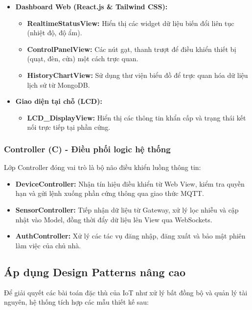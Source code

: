 \documentclass[a4paper,twoside]{article}
\begin{document}
\begin{itemize}
    \item \textbf{Dashboard Web (React.js \& Tailwind CSS):}
    \begin{itemize}
        \item \textbf{RealtimeStatusView:} Hiển thị các widget dữ liệu biến đổi liên tục (nhiệt độ, độ ẩm).
        \item \textbf{ControlPanelView:} Các nút gạt, thanh trượt để điều khiển thiết bị (quạt, đèn, cửa) một cách trực quan.
        \item \textbf{HistoryChartView:} Sử dụng thư viện biểu đồ để trực quan hóa dữ liệu lịch sử từ MongoDB.
    \end{itemize}
    
    \item \textbf{Giao diện tại chỗ (LCD):}
    \begin{itemize}
        \item \textbf{LCD\_DisplayView:} Hiển thị các thông tin khẩn cấp và trạng thái kết nối trực tiếp tại phần cứng.
    \end{itemize}
\end{itemize}

\subsubsection{Controller (C) - Điều phối logic hệ thống}
Lớp Controller đóng vai trò là bộ não điều khiển luồng thông tin:

\begin{itemize}
    \item \textbf{DeviceController:} Nhận tín hiệu điều khiển từ Web View, kiểm tra quyền hạn và gửi lệnh xuống phần cứng thông qua giao thức MQTT.
    \item \textbf{SensorController:} Tiếp nhận dữ liệu từ Gateway, xử lý lọc nhiễu và cập nhật vào Model, đồng thời đẩy dữ liệu lên View qua WebSockets.
    \item \textbf{AuthController:} Xử lý các tác vụ đăng nhập, đăng xuất và bảo mật phiên làm việc của chủ nhà.
\end{itemize}

\subsection{Áp dụng Design Patterns nâng cao}
Để giải quyết các bài toán đặc thù của IoT như xử lý bất đồng bộ và quản lý tài nguyên, hệ thống tích hợp các mẫu thiết kế sau:
\end{document}

